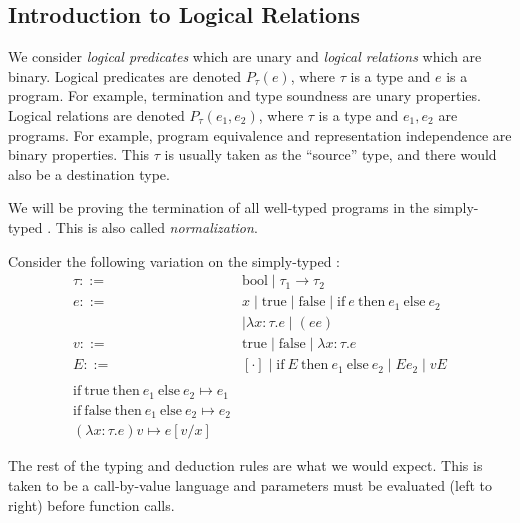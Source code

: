 \subsection{Introduction to Logical Relations}
We consider \emph{logical predicates} which are unary and \emph{logical relations} which are binary. 
Logical predicates are denoted $P_\tau (e)$, where $\tau$ is a type and $e$ is a program. For example, termination and type
soundness are unary properties. 
Logical relations are denoted $P_\tau (e_1, e_2)$, where $\tau$ is a type and $e_1, e_2$ are programs. For example, program equivalence
and representation independence are binary properties. This $\tau$ is usually taken as the ``source'' type, and there would
also be a destination type.

We will be proving the termination of all well-typed programs in the simply-typed \lc. This is also called \emph{normalization}.

Consider the following variation on the simply-typed \lc:
\[
\begin{array}{rl}
\tau ::= &\mathrm{bool} \mid \tau_1 \to \tau_2 \\
e ::= &x \mid \mathrm{true} \mid \mathrm{false} \mid \mathrm{if}~e~\mathrm{then}~e_1~\mathrm{else}~e_2  \\
& \mid \lambda x: \tau. e \mid (e e) \\
v ::= & \mathrm{true} \mid \mathrm{false} \mid \lambda x: \tau. e \\
E ::= & [ \cdot ] \mid \mathrm{if}~E~\mathrm{then}~e_1~\mathrm{else}~e_2 \mid E e_2 \mid v E \\
& \\
\mathrm{if~true~then}~e_1~\mathrm{else}~e_2 \mapsto e_1 &\\
\mathrm{if~false~then}~e_1~\mathrm{else}~e_2 \mapsto e_2 &\\
(\lambda x: \tau. e) v \mapsto e[v/x]
\end{array}
\]

The rest of the typing and deduction rules are what we would expect.
This is taken to be a call-by-value language and parameters must be evaluated (left to right) before function calls.

